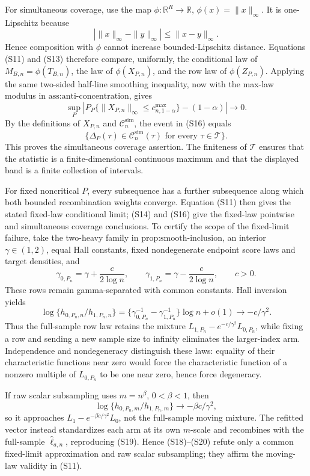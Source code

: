 For simultaneous coverage, use the map \(\phi:\mathbb R^R\to\mathbb R\), \(\phi(x)=\|x\|_\infty\). It is one-Lipschitz because
\[
|\|x\|_\infty-\|y\|_\infty|\le\|x-y\|_\infty.
\tag{S15}
\]
Hence composition with \(\phi\) cannot increase bounded-Lipschitz distance. Equations (S11) and (S13) therefore compare, uniformly, the conditional law of
\(M_{B,n}=\phi(T_{B,n})\), the law of \(\phi(X_{P,n})\), and the row law of \(\phi(Z_{P,n})\). Applying the same two-sided half-line smoothing inequality, now with the max-law modulus in \(\text{ass:anti-concentration}\), gives
\[
\sup_P\left|
P_P\{\|X_{P,n}\|_\infty\le c^{\max}_{n,1-\alpha}\}-(1-\alpha)
\right|\to0.
\tag{S16}
\]
By the definitions of \(X_{P,n}\) and \(\mathcal C_n^{\mathrm{sim}}\), the event in (S16) equals
\[
\{\Delta_P(\tau)\in\mathcal C_n^{\mathrm{sim}}(\tau)
\text{ for every }\tau\in\mathcal T\}.
\tag{S17}
\]
This proves the simultaneous coverage assertion. The finiteness of \(\mathcal T\) ensures that the statistic is a finite-dimensional continuous maximum and that the displayed band is a finite collection of intervals.

For fixed noncritical \(P\), every subsequence has a further subsequence along which both bounded recombination weights converge. Equation (S11) then gives the stated fixed-law conditional limit; (S14) and (S16) give the fixed-law pointwise and simultaneous coverage conclusions. To certify the scope of the fixed-limit failure, take the two-heavy family in \(\text{prop:smooth-inclusion}\), an interior \(\gamma\in(1,2)\), equal Hall constants, fixed nondegenerate endpoint score laws and target densities, and
\[
\gamma_{0,P_n}=\gamma+\frac c{2\log n},
\qquad
\gamma_{1,P_n}=\gamma-\frac c{2\log n},
\qquad c>0.
\tag{S18}
\]
These rows remain gamma-separated with common constants. Hall inversion yields
\[
\log\{h_{0,P_n,n}/h_{1,P_n,n}\}
=\{\gamma_{0,P_n}^{-1}-\gamma_{1,P_n}^{-1}\}\log n+o(1)
\longrightarrow-c/\gamma^2.
\tag{S19}
\]
Thus the full-sample row law retains the mixture
\(L_{1,P_n}-e^{-c/\gamma^2}L_{0,P_n}\), while fixing a row and sending a new sample size to infinity eliminates the larger-index arm. Independence and nondegeneracy distinguish these laws: equality of their characteristic functions near zero would force the characteristic function of a nonzero multiple of \(L_{0,P_n}\) to be one near zero, hence force degeneracy.

If raw scalar subsampling uses \(m=n^\beta\), \(0<\beta<1\), then
\[
\log\{h_{0,P_n,m}/h_{1,P_n,m}\}\longrightarrow-\beta c/\gamma^2,
\tag{S20}
\]
so it approaches \(L_1-e^{-\beta c/\gamma^2}L_0\), not the full-sample moving mixture. The refitted vector instead standardizes each arm at its own \(m\)-scale and recombines with the full-sample \(\widehat\ell_{a,n}\), reproducing (S19). Hence (S18)--(S20) refute only a common fixed-limit approximation and raw scalar subsampling; they affirm the moving-law validity in (S11).
